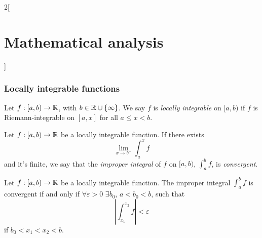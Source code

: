 \documentclass[../../../main.tex]{subfiles}
\begin{document}
\begin{multicols}{2}[\section{Mathematical analysis}]
  \subsubsection{Locally integrable functions}
  \begin{definition}
    Let $f:[a,b)\rightarrow\mathbb{R} $, with $b\in\mathbb{R} \cup\{\infty\}$. We say $f$ is \emph{locally integrable} on $[a,b)$ if $f$ is Riemann-integrable on $[a,x]$ for all $a\leq x<b$.
  \end{definition}
  \begin{definition}
    Let $f:[a,b)\rightarrow\mathbb{R} $ be a locally integrable function. If there exists $$\lim_{x\to b^-}\int_a^x f$$ and it's finite, we say that the \emph{improper integral} of $f$ on $[a,b)$, $\displaystyle\int_a^b f$, is \emph{convergent}.
  \end{definition}
  \begin{theorem}
    Let $f:[a,b)\rightarrow\mathbb{R} $ be a locally integrable function. The improper integral $\displaystyle\int_a^b f$ is convergent if and only if $\forall\varepsilon>0$ $\exists b_0$, $a<b_0<b$, such that $$\left|\int_{x_1}^{x_2} f\right|<\varepsilon$$ if $b_0<x_1<x_2<b$.
  \end{theorem}

\end{multicols}
\end{document}

